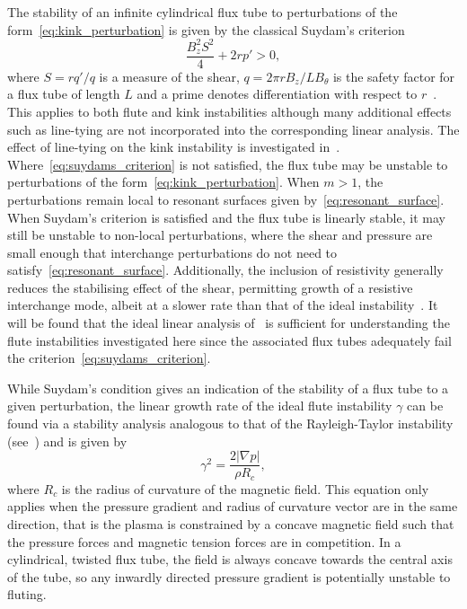\documentclass[fleqn,usenatbib]{mnras}
\newcommand{\rs}[2]{{#2}}
\begin{document}
The stability of an infinite cylindrical flux tube to perturbations of
the form~\eqref{eq:kink_perturbation} is given by the classical
\rs{}{Suydam's criterion~\citep{suydamStabilityLinearPinch1958}}
\begin{equation}
  \label{eq:suydams_criterion}
\frac{B_z^2 S^2}{4} + 2 r p' > 0,
\end{equation}
where $S = r q'/q$ is a measure of the shear, $q = 2\pi r B_z / L
B_{\theta}$ is the safety factor for a flux tube of length $L$ and a
\rs{dash}{prime} denotes differentiation with respect to
$r$~\citep{mikhailovskiiInstabilitiesConfinedPlasma1998}. This applies
to both flute and kink instabilities although many
additional effects such as line-tying are not incorporated into the
corresponding linear analysis. The effect of line-tying on the kink
instability \rs{can be found}{is investigated}
in~\citet{hoodKinkInstabilitySolar1979}. Where~\eqref{eq:suydams_criterion}
is not satisfied, the flux tube may be unstable to perturbations of
the form~\eqref{eq:kink_perturbation}. When $m>1$, the perturbations
remain local to resonant surfaces given
by~\eqref{eq:resonant_surface}. 
\rs{}{When} Suydam's criterion is satisfied and the flux tube is linearly stable, it may still be unstable to non-local perturbations, where the shear and pressure are small enough that interchange perturbations do not need to satisfy~\eqref{eq:resonant_surface}. Additionally, the inclusion of resistivity generally reduces the stabilising effect of the shear, permitting growth of a resistive interchange mode, albeit at a slower rate than that of the ideal instability~\citep{mikhailovskiiInstabilitiesConfinedPlasma1998}. It will be found that the ideal linear analysis of~\cite{mikhailovskiiInstabilitiesConfinedPlasma1998} is sufficient for understanding the flute instabilities investigated here since the associated flux tubes adequately fail the criterion~\eqref{eq:suydams_criterion}.

While Suydam's condition gives an indication of the stability of a flux tube to a given perturbation, the linear growth rate of the ideal flute instability $\gamma$ can be found via a stability analysis analogous to that of the Rayleigh-Taylor instability (see~\citep[][]{goldstonIntroductionPlasmaPhysics2020}) and is given by
\begin{equation}
  \label{eq:fluting_growth_rate}
\gamma^2 = \frac{2|\nabla p|}{\rho R_c},
\end{equation}
where $R_c$ is the radius of curvature of the magnetic field. This equation only applies when the pressure gradient and radius of curvature vector are in the same direction, that is the plasma is constrained by a concave magnetic field such that the pressure forces and magnetic tension forces are in competition. In a cylindrical, twisted flux tube, the field is always concave towards the central axis of the tube, so any inwardly directed pressure gradient is potentially unstable to fluting.
\end{document}
